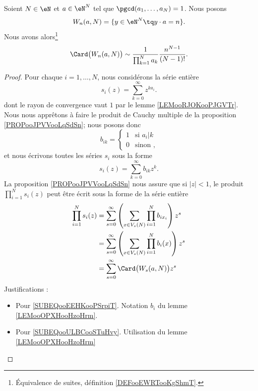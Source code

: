 \begin{theorem} \label{THOooQDYWooCOiUMb}
	Soient \( N\in \eN\) et \( a\in \eN^N\) tel que \( \pgcd(a_1,\ldots, a_{N})=1\). Nous posons
	\begin{equation}
		W_n(a,N)=\{ y\in \eN^N\tq y\cdot a=n \}.
	\end{equation}
	Nous avons alors\footnote{Équivalence de suites, définition \ref{DEFooEWRTooKgShmT}.}
	\begin{equation}
		\Card\big( W_n(a,N) \big)\sim\frac{1}{ \prod_{k=1}^Na_k }\frac{ n^{N-1} }{ (N-1)! }.
	\end{equation}
\end{theorem}

\begin{proof}
	Pour chaque \( i=1,\ldots, N\), nous considérons la série entière
	\begin{equation}
		s_i(z)=\sum_{k=0}^{\infty}z^{ka_i}.
	\end{equation}
	dont le rayon de convergence vaut \( 1\) par le lemme \ref{LEMooRJOKooPJGVTr}. Nous nous apprêtons à faire le produit de Cauchy multiple de la proposition \ref{PROPooJPVVooLqSdSn}; nous posons donc
	\begin{equation}
		b_{ik}=\begin{cases}
			1 & \text{si } a_i|k \\
			0 & \text{sinon },
		\end{cases}
	\end{equation}
	et nous écrivons toutes les séries \( s_i\) sous la forme
	\begin{equation}
		s_i(z)=\sum_{k=0}^{\infty}b_{ik}z^k.
	\end{equation}
	La proposition \ref{PROPooJPVVooLqSdSn} nous assure que si \( | z |<1\), le produit \( \prod_{i=1}^Ns_i(z)\) peut être écrit sous la forme de la série entière
	\begin{subequations}        \label{SUBEQooYESHooChEKGm}
		\begin{align}
			\prod_{i=1}^Ns_i(z) & =\sum_{s=0}^{\infty}\left( \sum_{x\in V_s(N)}\prod_{i=1}^Nb_{ix_i} \right)z^s                                  \\
			                    & =\sum_{s=0}^{\infty}\left( \sum_{x\in V_s(N)}\prod_{i=1}^Nb_i(x) \right)z^s        \label{SUBEQooEEHKooPSrpiT} \\
			                    & =\sum_{s=0}^{\infty}\Card\big( W_s(a,N) \big)z^s       \label{SUBEQooULBCooSTuHvy}
		\end{align}
	\end{subequations}
	Justifications :
	\begin{itemize}
		\item Pour \eqref{SUBEQooEEHKooPSrpiT}. Notation \( b_i\) du lemme \ref{LEMooOPXHooHzoHrm}.
		\item Pour \eqref{SUBEQooULBCooSTuHvy}. Utilisation du lemme \ref{LEMooOPXHooHzoHrm}
	\end{itemize}


\end{proof}
